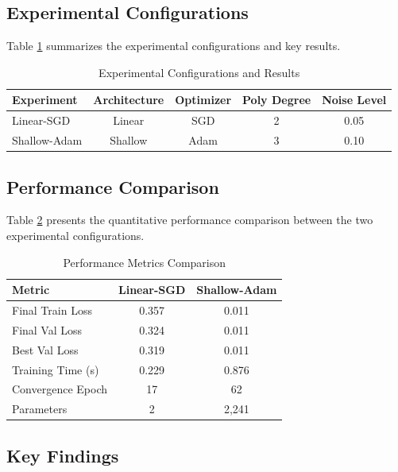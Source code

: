 \documentclass[11pt,twocolumn]{article}
\begin{document}
\subsection{Experimental Configurations}

Table \ref{tab:experiments} summarizes the experimental configurations and key results.

\begin{table}[H]
\centering
\caption{Experimental Configurations and Results}
\label{tab:experiments}
\begin{tabular}{@{}lcccc@{}}
\toprule
\textbf{Experiment} & \textbf{Architecture} & \textbf{Optimizer} & \textbf{Poly Degree} & \textbf{Noise Level} \\
\midrule
Linear-SGD & Linear & SGD & 2 & 0.05 \\
Shallow-Adam & Shallow & Adam & 3 & 0.10 \\
\bottomrule
\end{tabular}
\end{table}

\subsection{Performance Comparison}

Table \ref{tab:performance} presents the quantitative performance comparison between the two experimental configurations.

\begin{table}[H]
\centering
\caption{Performance Metrics Comparison}
\label{tab:performance}
\begin{tabular}{@{}lcc@{}}
\toprule
\textbf{Metric} & \textbf{Linear-SGD} & \textbf{Shallow-Adam} \\
\midrule
Final Train Loss & 0.357 & 0.011 \\
Final Val Loss & 0.324 & 0.011 \\
Best Val Loss & 0.319 & 0.011 \\
Training Time (s) & 0.229 & 0.876 \\
Convergence Epoch & 17 & 62 \\
Parameters & 2 & 2,241 \\
\bottomrule
\end{tabular}
\end{table}

\subsection{Key Findings}
\end{document}

